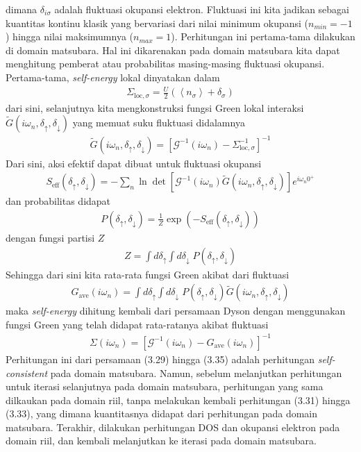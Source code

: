 dimana $\delta_{i\sigma}$ adalah fluktuasi okupansi elektron. Fluktuasi ini kita jadikan sebagai kuantitas kontinu klasik yang bervariasi dari nilai minimum okupansi ($n_{min} = -1$) hingga nilai maksimumnya ($n_{max} = 1$). Perhitungan ini pertama-tama dilakukan di domain matsubara. Hal ini dikarenakan pada domain matsubara kita dapat menghitung pemberat atau probabilitas masing-masing fluktuasi okupansi. Pertama-tama, \textit{self-energy} lokal dinyatakan dalam
\begin{align}
\Sigma_{\text{loc},\sigma} = \frac{U}{2}\left(\left< n_\sigma \right> + \delta_\sigma\right) 
\end{align}
dari sini, selanjutnya kita mengkonstruksi fungsi Green lokal interaksi $\tilde{G}(i\omega_n, \delta_{\uparrow}, \delta_{\downarrow})$ yang memuat suku fluktuasi didalamnya
\begin{align}
\tilde{G}(i\omega_n, \delta_{\uparrow}, \delta_{\downarrow}) = \left[ \mathcal{G}^{-1}(i\omega_n) - \Sigma_{\text{loc},\sigma}^{-1} \right]^{-1}
\end{align}
Dari sini, aksi efektif dapat dibuat untuk fluktuasi okupansi
\begin{align}
S_{\text{eff}}(\delta_\uparrow,\delta_\downarrow) = - \sum_n \ln \det \left[ \mathcal{G}^{-1}(i\omega_n) \tilde{G}(i\omega_n,\delta_\uparrow,\delta_\downarrow) \right] e^{i\omega_n 0^+}
\end{align}
dan probabilitas didapat
\begin{align}
P(\delta_\uparrow, \delta_\downarrow) = \frac{1}{Z} \exp(-S_{\text{eff}}(\delta_\uparrow,\delta_\downarrow))
\end{align}
dengan fungsi partisi $Z$
\begin{align}
Z = \int d\delta_\uparrow \int d\delta_\downarrow \; P(\delta_\uparrow, \delta_\downarrow)
\end{align}
Sehingga dari sini kita rata-rata fungsi Green akibat dari fluktuasi
\begin{align}
G_{\text{ave}}(i\omega_n) = \int d\delta_\uparrow \int d\delta_\downarrow \; P(\delta_\uparrow, \delta_\downarrow) \tilde{G}(i\omega_n, \delta_{\uparrow}, \delta_{\downarrow})
\end{align}
maka \textit{self-energy} dihitung kembali dari persamaan Dyson dengan menggunakan fungsi Green yang telah didapat rata-ratanya akibat fluktuasi
\begin{align}
\Sigma(i\omega_n) = \left[\mathcal{G}^{-1}(i\omega_n) - G_{\text{ave}}(i\omega_n)\right]^{-1}
\end{align}
Perhitungan ini dari persamaan (3.29) hingga (3.35) adalah perhitungan \textit{self-consistent} pada domain matsubara. Namun, sebelum melanjutkan perhitungan untuk iterasi selanjutnya pada domain matsubara, perhitungan yang sama dilkaukan pada domain riil, tanpa melakukan kembali perhitungan (3.31) hingga (3.33), yang dimana kuantitasnya didapat dari perhitungan pada domain matsubara. Terakhir, dilakukan perhitungan DOS dan okupansi elektron pada domain riil, dan kembali melanjutkan ke iterasi pada domain matsubara.

